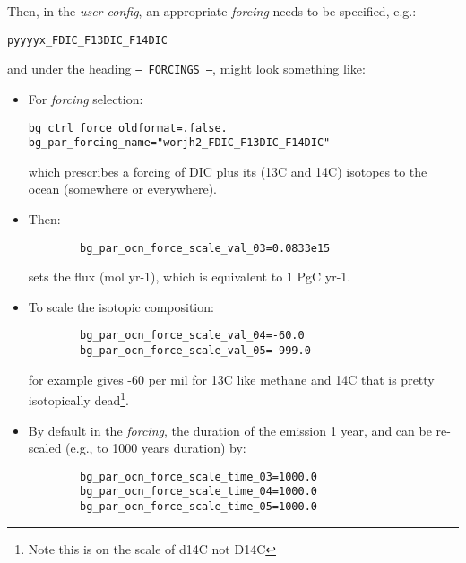 \documentclass[11pt,fleqn]{book} %
\begin{document}
Then, in the \textit{user-config}, an appropriate \textit{forcing} needs to be specified, e.g.:
\vspace{-2mm}\small\begin{verbatim}
pyyyyx_FDIC_F13DIC_F14DIC
\end{verbatim}\normalsize\vspace{-2mm}
and under the heading \texttt{--- FORCINGS ---}, might look something like:

\begin{itemize}[noitemsep]
\setlength{\itemindent}{.2in}

\vspace{1mm}
\item For \textit{forcing} selection:
\\\vspace{-2mm}\small\begin{verbatim}
bg_ctrl_force_oldformat=.false.
bg_par_forcing_name="worjh2_FDIC_F13DIC_F14DIC"
\end{verbatim}\normalsize\vspace{-2mm}
which prescribes a forcing of DIC plus its (13C and 14C) isotopes to the ocean (somewhere or everywhere).

\vspace{1mm}
\item Then:
\\\vspace{-6mm}\small\begin{verbatim}
        bg_par_ocn_force_scale_val_03=0.0833e15
\end{verbatim}\normalsize\vspace{-2mm}
sets the flux (mol yr-1), which is equivalent to 1 PgC yr-1.

\vspace{1mm}
\item To scale the isotopic composition:
\\\vspace{-4mm}\small\begin{verbatim}
        bg_par_ocn_force_scale_val_04=-60.0
        bg_par_ocn_force_scale_val_05=-999.0
\end{verbatim}\normalsize\vspace{-2mm}
for example gives -60 per mil for 13C like methane and 14C that is pretty isotopically dead\footnote{Note this is on the scale of d14C not D14C}.

\vspace{1mm}
        \item By default in the \textit{forcing}, the duration of the emission 1 year, and can be re-scaled (e.g., to 1000 years duration) by:
\\\vspace{-2mm}\small\begin{verbatim}
        bg_par_ocn_force_scale_time_03=1000.0
        bg_par_ocn_force_scale_time_04=1000.0
        bg_par_ocn_force_scale_time_05=1000.0
\end{verbatim}\normalsize\vspace{-2mm}


\end{itemize}
\end{document}
